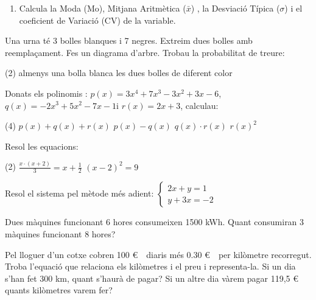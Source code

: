 \begin{mylist}
\begin{enumerate}
\item Calcula la Moda (Mo),  Mitjana Aritmètica ($\bar x$) ,  la Desviació Típica ($\sigma$)  i el  coeficient de Variació (CV)  de la variable.
		\end{enumerate}
	
	 
	
	\exer[2] Una urna té 3 bolles blanques i 7 negres. Extreim dues bolles amb reemplaçament. Fes un diagrama d'arbre. Trobau la probabilitat de treure:
	\begin{tasks}(2)
		\task almenys una bolla blanca
		\task les dues bolles de diferent color
	\end{tasks} 
 
	\exer[2] Donats els polinomis : $p(x)=3x^4+7x^3-3x^2+3x-6$, $q(x)=-2x^3+5x^2-7x-1$i $r(x)=2x+3$, calculau:
	\begin{tasks}(4)
		\task $p(x)+q(x)+r(x)$
		\task $p(x)-q(x)$
		\task $q(x)\cdot r(x)$
		\task $r(x)^2$
	\end{tasks}
	 
	 \exer[2] Resol les equacions:
	\begin{tasks}(2)
		\task $\frac{x\cdot (x+2)}{3}=x+\frac{1}{2}$  
		\task ${(x-2)}^2=9$
	\end{tasks} 
	
	\exer[2] Resol el sistema pel mètode més adient: $\left \{ \begin{array}{c}
	2x+y=1 \\ 
	y+3x=-2 \end{array}
	\right.$ 
	
	\exer[2] Dues màquines funcionant 6 hores consumeixen 1500 kWh. Quant consumiran 3 màquines funcionant 8 hores?
	
	\exer[2] Pel lloguer d'un cotxe cobren 100 \euro\ \ diaris més 0.30 \euro\ \ per kilòmetre recorregut. Troba l'equació que relaciona els kilòmetres i el preu i representa-la. Si un dia s'han fet 300 km, quant s'haurà de pagar? Si un altre dia vàrem pagar 119,5 \euro\ \, quants kilòmetres varem fer?
	
	 
	

\end{mylist}
